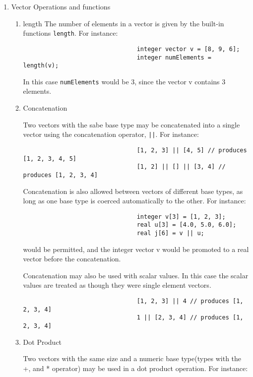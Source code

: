 \documentclass[../../gazprea.tex]{subfiles}
\begin{document}
			\begin{enumerate}
				\item Vector Operations and functions
					\begin{enumerate}
						\item length
							The number of elements in a vector is given by the built-in functions \texttt{length}. For
							instance:

							\begin{lstlisting}
								integer vector v = [8, 9, 6];
								integer numElements = length(v);
							\end{lstlisting}

							In this case \texttt{numElements} would be 3, since the vector v contains 3 elements.

						\item Concatenation

							Two vectors with the sabe base type may be concatenated into a single vector using the
							concatenation operator, \texttt{||}. For instance:

							\begin{lstlisting}
								[1, 2, 3] || [4, 5] // produces [1, 2, 3, 4, 5]
								[1, 2] || [] || [3, 4] // produces [1, 2, 3, 4]
							\end{lstlisting}

							Concatenation is also allowed between vectors of different base types, as long as one base
							type is coerced automatically to the other. For instance:

							\begin{lstlisting}
								integer v[3] = [1, 2, 3];
								real u[3] = [4.0, 5.0, 6.0];
								real j[6] = v || u;
							\end{lstlisting}

							would be permitted, and the integer vector v would be promoted to a real vector before the
							concatenation.

							Concatenation may also be used with scalar values. In this case the scalar values are
							treated as though they were single element vectors.

							\begin{lstlisting}
								[1, 2, 3] || 4 // produces [1, 2, 3, 4]
								1 || [2, 3, 4] // produces [1, 2, 3, 4]
							\end{lstlisting}

						\item Dot Product

							Two vectors with the same size and a numeric base type(types with the +, and * operator)
							may be used in a dot product operation. For instance:


\end{enumerate}
\end{enumerate}
\end{document}
